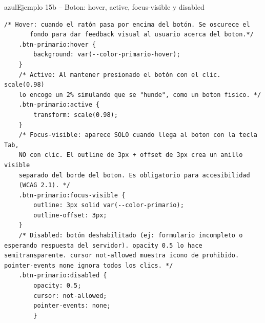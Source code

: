 \documentclass[11pt,a4paper]{article}
\begin{document}
	\begin{cajacodigo}{azul}{Ejemplo 15b -- Boton: hover, active, focus-visible y disabled}
		\begin{lstlisting}[style=codecss]
	/* Hover: cuando el ratón pasa por encima del botón. Se oscurece el
	   fondo para dar feedback visual al usuario acerca del boton.*/
	.btn-primario:hover {
		background: var(--color-primario-hover);
	}	
	/* Active: Al mantener presionado el botón con el clic. scale(0.98)
	lo encoge un 2% simulando que se "hunde", como un boton fisico. */
	.btn-primario:active {
		transform: scale(0.98);
	}	
	/* Focus-visible: aparece SOLO cuando llega al boton con la tecla Tab,
	NO con clic. El outline de 3px + offset de 3px crea un anillo visible
	separado del borde del boton. Es obligatorio para accesibilidad
	(WCAG 2.1). */
	.btn-primario:focus-visible {
		outline: 3px solid var(--color-primario);
		outline-offset: 3px;
	}
	/* Disabled: botón deshabilitado (ej: formulario incompleto o esperando respuesta del servidor). opacity 0.5 lo hace semitransparente. cursor not-allowed muestra icono de prohibido. pointer-events none ignora todos los clics. */
	.btn-primario:disabled {
		opacity: 0.5;
		cursor: not-allowed;
		pointer-events: none;
		} \end{lstlisting}
	\end{cajacodigo}
	
\end{document}
